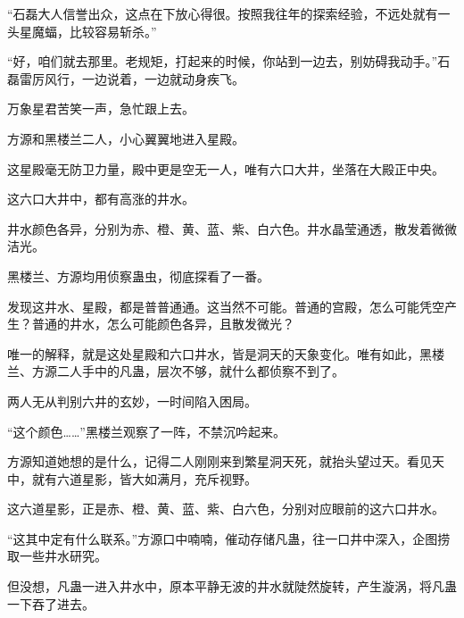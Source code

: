 \begin{this_body}
“石磊大人信誉出众，这点在下放心得很。按照我往年的探索经验，不远处就有一头星魔蝠，比较容易斩杀。”

“好，咱们就去那里。老规矩，打起来的时候，你站到一边去，别妨碍我动手。”石磊雷厉风行，一边说着，一边就动身疾飞。

万象星君苦笑一声，急忙跟上去。

方源和黑楼兰二人，小心翼翼地进入星殿。

这星殿毫无防卫力量，殿中更是空无一人，唯有六口大井，坐落在大殿正中央。

这六口大井中，都有高涨的井水。

井水颜色各异，分别为赤、橙、黄、蓝、紫、白六色。井水晶莹通透，散发着微微洁光。

黑楼兰、方源均用侦察蛊虫，彻底探看了一番。

发现这井水、星殿，都是普普通通。这当然不可能。普通的宫殿，怎么可能凭空产生？普通的井水，怎么可能颜色各异，且散发微光？

唯一的解释，就是这处星殿和六口井水，皆是洞天的天象变化。唯有如此，黑楼兰、方源二人手中的凡蛊，层次不够，就什么都侦察不到了。

两人无从判别六井的玄妙，一时间陷入困局。

“这个颜色……”黑楼兰观察了一阵，不禁沉吟起来。

方源知道她想的是什么，记得二人刚刚来到繁星洞天死，就抬头望过天。看见天中，就有六道星影，皆大如满月，充斥视野。

这六道星影，正是赤、橙、黄、蓝、紫、白六色，分别对应眼前的这六口井水。

“这其中定有什么联系。”方源口中喃喃，催动存储凡蛊，往一口井中深入，企图捞取一些井水研究。

但没想，凡蛊一进入井水中，原本平静无波的井水就陡然旋转，产生漩涡，将凡蛊一下吞了进去。

\end{this_body}

